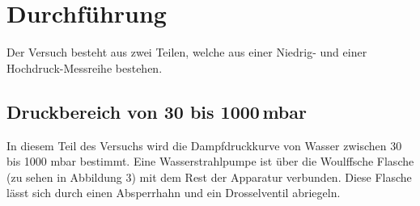 \section{Durchführung}
\label{sec:Durchführung}

Der Versuch besteht aus zwei Teilen, welche aus einer Niedrig- und einer Hochdruck-Messreihe bestehen.
\subsection{Druckbereich von 30 bis 1000\,mbar}
In diesem Teil des Versuchs wird die Dampfdruckkurve von Wasser zwischen 30 bis 1000 mbar bestimmt.
Eine Wasserstrahlpumpe ist über die Woulffsche Flasche (zu sehen in Abbildung 3) mit dem Rest der Apparatur verbunden.
Diese Flasche lässt sich durch einen Absperrhahn und ein Drosselventil abriegeln.\\ 
